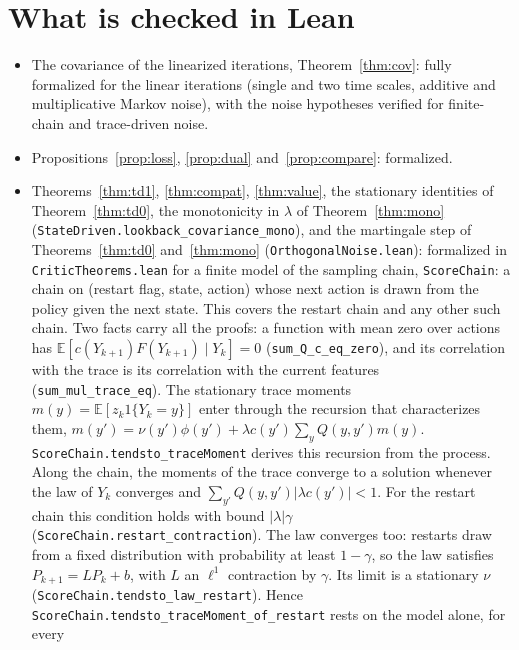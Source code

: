 \documentclass[11pt]{article}
\theoremstyle{definition}
\theoremstyle{remark}
\newcommand{\E}{\mathbb{E}}
\begin{document}
\section{What is checked in Lean}

\begin{itemize}
\item The covariance of the linearized iterations, Theorem~\ref{thm:cov}: fully formalized for the
  linear iterations (single and two time scales, additive and multiplicative Markov noise), with the
  noise hypotheses verified for finite-chain and trace-driven noise.
\item Propositions~\ref{prop:loss}, \ref{prop:dual} and~\ref{prop:compare}: formalized.
\item Theorems~\ref{thm:td1}, \ref{thm:compat}, \ref{thm:value}, the stationary identities of
  Theorem~\ref{thm:td0}, the monotonicity in $\lambda$ of Theorem~\ref{thm:mono}
  (\texttt{StateDriven.lookback\_covariance\_mono}), and the martingale step of Theorems~\ref{thm:td0}
  and~\ref{thm:mono}
  (\texttt{OrthogonalNoise.lean}): formalized in
  \texttt{CriticTheorems.lean} for a finite model of the sampling
  chain, \texttt{ScoreChain}: a chain on (restart flag, state, action) whose next action is drawn from
  the policy given the next state. This covers the restart chain and any other such chain. Two
  facts carry all the proofs: a function with mean zero over actions has
  $\E[c(Y_{k+1})F(Y_{k+1})\mid Y_k] = 0$ (\texttt{sum\_Q\_c\_eq\_zero}), and its correlation with the
  trace is its correlation with the current features (\texttt{sum\_mul\_trace\_eq}). The stationary
  trace moments $m(y) = \E[z_k1\{Y_k = y\}]$ enter through the recursion that characterizes them,
  $m(y') = \nu(y')\phi(y') + \lambda c(y')\sum_yQ(y,y')m(y)$. \texttt{ScoreChain.tendsto\_traceMoment}
  derives this recursion from the process. Along the chain, the moments of the trace converge
  to a solution whenever the law of $Y_k$ converges and $\sum_{y'}Q(y,y')|\lambda c(y')| < 1$.
  For the restart chain this condition holds with bound $|\lambda|\gamma$
  (\texttt{ScoreChain.restart\_contraction}). The law converges too: restarts draw from a fixed
  distribution with probability at least $1 - \gamma$, so the law satisfies
  $P_{k+1} = LP_k + b$, with $L$ an $\ell^1$ contraction by $\gamma$. Its limit is a stationary
  $\nu$ (\texttt{ScoreChain.tendsto\_law\_restart}). Hence
  \texttt{ScoreChain.tendsto\_traceMoment\_of\_restart} rests on the model alone, for every

\end{itemize}
\end{document}
